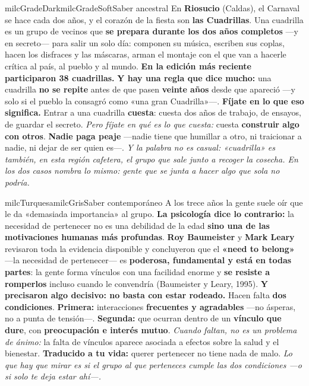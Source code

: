 \documentclass[11pt,letterpaper]{article}
\begin{document}
\begin{softbox}{milcGradeDark}{milcGradeSoft}{Saber ancestral}
En \textbf{Riosucio} (Caldas), el Carnaval se hace cada dos años, y el corazón de la fiesta son \textbf{las Cuadrillas}. Una cuadrilla es un grupo de vecinos que \textbf{se prepara durante los dos años completos} ---y en secreto--- para salir un solo día: componen su música, escriben sus coplas, hacen los disfraces y las máscaras, arman el montaje con el que van a hacerle crítica al país, al pueblo y al mundo. \textbf{En la edición más reciente participaron 38 cuadrillas.} \textbf{Y hay una regla que dice mucho:} una cuadrilla \textbf{no se repite} antes de que pasen \textbf{veinte años} desde que apareció ---y solo si el pueblo la consagró como «una gran Cuadrilla»---. \textbf{Fíjate en lo que eso significa.} Entrar a una cuadrilla \textbf{cuesta}: cuesta dos años de trabajo, de ensayos, de guardar el secreto. \emph{Pero fíjate en qué es lo que cuesta:} cuesta \textbf{construir algo con otros}. \textbf{Nadie paga peaje} ---nadie tiene que humillar a otro, ni traicionar a nadie, ni dejar de ser quien es---. \emph{Y la palabra no es casual: «cuadrilla» es también, en esta región cafetera, el grupo que sale junto a recoger la cosecha. En los dos casos nombra lo mismo: gente que se junta a hacer algo que sola no podría.}
\end{softbox}

\begin{softbox}{milcTurquesa}{milcGris}{Saber contemporáneo}
A los trece años la gente suele oír que le da «demasiada importancia» al grupo. \textbf{La psicología dice lo contrario:} la necesidad de pertenecer no es una debilidad de la edad \textbf{sino una de las motivaciones humanas más profundas}. \textbf{Roy Baumeister} y \textbf{Mark Leary} revisaron toda la evidencia disponible y concluyeron que el \textbf{«need to belong»} ---la necesidad de pertenecer--- es \textbf{poderosa, fundamental y está en todas partes}: la gente forma vínculos con una facilidad enorme y \textbf{se resiste a romperlos} incluso cuando le convendría (Baumeister y Leary, 1995). \textbf{Y precisaron algo decisivo: no basta con estar rodeado.} Hacen falta \textbf{dos condiciones}. \textbf{Primera:} interacciones \textbf{frecuentes y agradables} ---no ásperas, no a punta de tensión---. \textbf{Segunda:} que ocurran dentro de un \textbf{vínculo que dure}, con \textbf{preocupación e interés mutuo}. \emph{Cuando faltan, no es un problema de ánimo:} la falta de vínculos aparece asociada a efectos sobre la salud y el bienestar. \textbf{Traducido a tu vida:} querer pertenecer no tiene nada de malo. \emph{Lo que hay que mirar es si el grupo al que perteneces cumple las dos condiciones ---o si solo te deja estar ahí---.}
\end{softbox}
\end{document}
